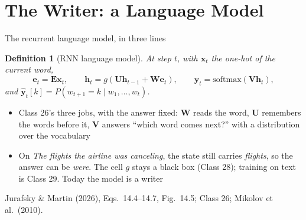 \documentclass[aspectratio=169, 11pt]{beamer}
\newtheorem{defx}[theorem]{Definition}
\newcommand{\srcline}[1]{%
  \par\vspace{0.25em}%
  {\scriptsize\color{mcMuted}\hfill #1\par}}
\begin{document}
\section{The Writer: a Language Model}

\begin{frame}{The recurrent language model, in three lines}
  \vspace{-0.45em}
  \begin{defx}[RNN language model]\label{th:lm}
    \small
    At step $t$, with $\mathbf{x}_t$ the one-hot of the current word,
    \[
      \mathbf{e}_t = \mathbf{E}\mathbf{x}_t, \qquad
      \mathbf{h}_t = g(\mathbf{U}\mathbf{h}_{t-1} + \mathbf{W}\mathbf{e}_t), \qquad
      \hat{\mathbf{y}}_t = \mathrm{softmax}(\mathbf{V}\mathbf{h}_t),
    \]
    and $\hat{\mathbf{y}}_t[k] = P(w_{t+1} = k \mid w_1, \dots, w_t)$.
  \end{defx}
  \vspace{-0.1em}
  {\footnotesize
  \begin{itemize}\itemsep0.2em
    \item Class 26's three jobs, with the answer fixed: $\mathbf{W}$
          \alert{reads} the word, $\mathbf{U}$ \alert{remembers} the words
          before it, $\mathbf{V}$ \alert{answers} ``which word comes next?''
          with a distribution over the vocabulary
    \item On \emph{The flights the airline was canceling}, the state still
          carries \emph{flights}, so the answer can be \emph{were}. The cell
          $g$ stays a black box (Class 28); training on text is Class 29.
          Today the model is a \alert{writer}
  \end{itemize}}
  \srcline{Jurafsky \& Martin (2026), Eqs.~14.4--14.7, Fig.~14.5; Class 26; Mikolov et al.\ (2010).}
\end{frame}
\end{document}
